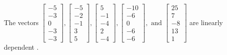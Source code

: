 \begin{exercise}
\begin{exerciseStatement}
  \end{exerciseStatement}
  \begin{exerciseAnswer}
   The vectors \(\left[\begin{array}{r}
-5 \\
-3 \\
0 \\
-3 \\
-3
\end{array}\right] , \left[\begin{array}{r}
-5 \\
-2 \\
-1 \\
3 \\
5
\end{array}\right] , \left[\begin{array}{r}
5 \\
-1 \\
-4 \\
2 \\
-4
\end{array}\right] , \left[\begin{array}{r}
-10 \\
-6 \\
0 \\
-6 \\
-6
\end{array}\right] , \text{ and } \left[\begin{array}{r}
25 \\
7 \\
-8 \\
13 \\
1
\end{array}\right]\) are 
  	 linearly dependent  .
  


  \end{exerciseAnswer}
\end{exercise}